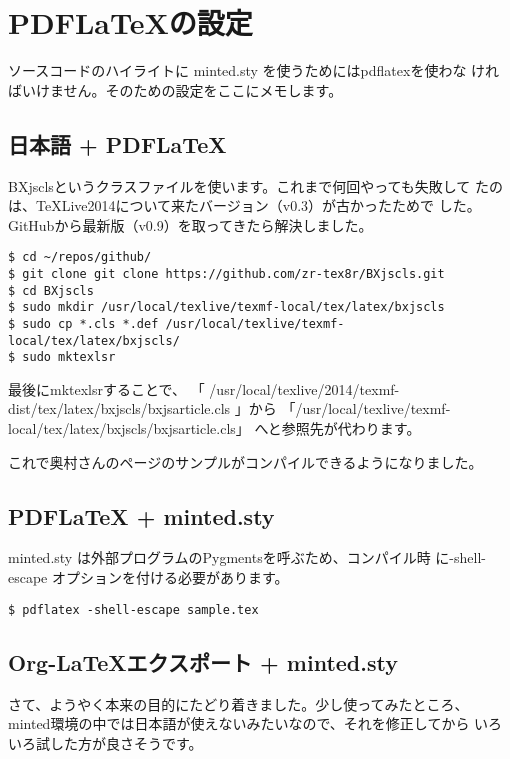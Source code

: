 \documentclass[dvipdfmx,12pt]{jsarticle}
\begin{document}
\section{PDFLaTeXの設定}
\label{sec-6}

ソースコードのハイライトに minted.sty を使うためにはpdflatexを使わな
ければいけません。そのための設定をここにメモします。

\subsection{日本語 + PDFLaTeX}
\label{sec-6-1}

BXjsclsというクラスファイルを使います。これまで何回やっても失敗して
たのは、TeXLive2014について来たバージョン（v0.3）が古かったためで
した。GitHubから最新版（v0.9）を取ってきたら解決しました。

\lstset{language=sh,label= ,caption= ,numbers=none}
\begin{lstlisting}
$ cd ~/repos/github/
$ git clone git clone https://github.com/zr-tex8r/BXjscls.git
$ cd BXjscls
$ sudo mkdir /usr/local/texlive/texmf-local/tex/latex/bxjscls
$ sudo cp *.cls *.def /usr/local/texlive/texmf-local/tex/latex/bxjscls/
$ sudo mktexlsr
\end{lstlisting}

最後にmktexlsrすることで、
「
/usr/local/texlive/2014/texmf-dist/tex/latex/bxjscls/bxjsarticle.cls
」から
「/usr/local/texlive/texmf-local/tex/latex/bxjscls/bxjsarticle.cls」
へと参照先が代わります。

これで奥村さんのページのサンプルがコンパイルできるようになりました。

\subsection{PDFLaTeX + minted.sty}
\label{sec-6-2}

minted.sty は外部プログラムのPygmentsを呼ぶため、コンパイル時
に-shell-escape オプションを付ける必要があります。

\lstset{language=sh,label= ,caption= ,numbers=none}
\begin{lstlisting}
$ pdflatex -shell-escape sample.tex
\end{lstlisting}

\subsection{Org-\LaTeX{}エクスポート + minted.sty}
\label{sec-6-3}

さて、ようやく本来の目的にたどり着きました。少し使ってみたところ、
minted環境の中では日本語が使えないみたいなので、それを修正してから
いろいろ試した方が良さそうです。
\end{document}
